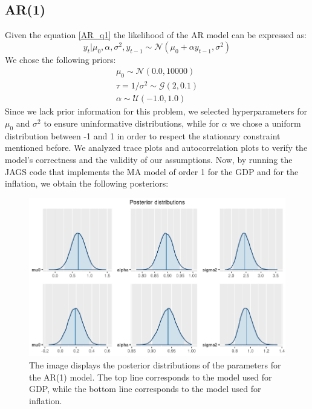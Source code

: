 \subsection*{AR(1)}
Given the equation \ref{AR_q1} the likelihood of the AR model can be expressed as:
\begin{equation}
    y_{t}|\mu_{0},\alpha,\sigma^2,y_{t-1}\sim \mathcal{N}(\mu_{0} + \alpha y_{t-1}, \sigma^2)
\end{equation}
We chose the following priors:
\begin{equation}
    \begin{split}
        \mu_0 \sim \mathcal{N}(0.0, 10000) \\
        \tau = 1 / \sigma^2 \sim \mathcal{G}(2, 0.1) \\
        \alpha \sim \mathcal{U}(-1.0, 1.0)
    \end{split}
\end{equation}
Since we lack prior information for this problem, we selected hyperparameters for $\mu_{0}$ and $\sigma^2$ to ensure uninformative distributions, while for $\alpha$ we chose a uniform distribution between -1 and 1 in order to respect the stationary constraint mentioned before.
We analyzed trace plots and autocorrelation plots to verify the model's correctness and the validity of our assumptions.
Now, by running the JAGS code that implements the MA model of order 1 for the GDP and for the inflation, we obtain the following posteriors: \\
\begin{figure}[H]
    \centering
    \includegraphics[width=\textwidth]{images/2-AR/posteriors.png}
    \caption{The image displays the posterior distributions of the parameters for the AR(1) model. The top line corresponds to the model used for GDP, while the bottom line corresponds to the model used for inflation.}
    \label{fig:AR_posteriors}
\end{figure}
